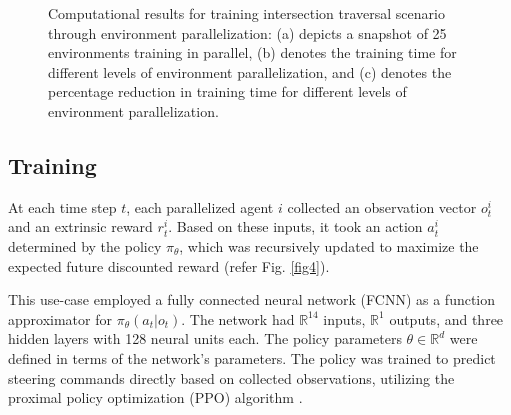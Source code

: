 \documentclass[letterpaper, 10 pt, conference]{ieeeconf}  %
\begin{document}
\begin{figure}[t]
\begin{subfigure}[b]{0.32\linewidth}
			\caption{}
			\label{fig7c}
		\end{subfigure}
		\caption{Computational results for training intersection traversal scenario through environment parallelization: (a) depicts a snapshot of 25 environments training in parallel, (b) denotes the training time for different levels of environment parallelization, and (c) denotes the percentage reduction in training time for different levels of environment parallelization.}
		\label{fig7}
	\end{figure}
	
	\subsection{Training}
	\label{Sub-Section: Training I}
	
	At each time step $t$, each parallelized agent $i$ collected an observation vector $o_t^i$ and an extrinsic reward $r_t^i$. Based on these inputs, it took an action $a_t^i$ determined by the policy $\pi_\theta$, which was recursively updated to maximize the expected future discounted reward (refer Fig. \ref{fig4}).
	
	This use-case employed a fully connected neural network (FCNN) as a function approximator for $\pi_\theta \left ( a_t | o_t \right )$. The network had $\mathbb{R}^{14}$ inputs, $\mathbb{R}^{1}$ outputs, and three hidden layers with 128 neural units each. The policy parameters $\theta \in \mathbb{R}^d$ were defined in terms of the network's parameters. The policy was trained to predict steering commands directly based on collected observations, utilizing the proximal policy optimization (PPO) algorithm \cite{PPO2017}.
	
\end{document}
